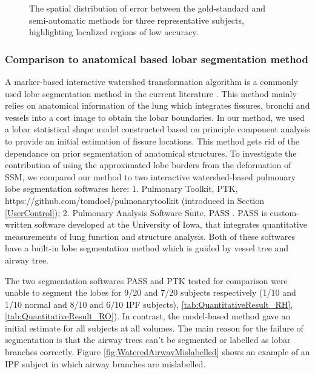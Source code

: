 {\begin{figure}[htbp]
\begin{subfigure}{.38 \linewidth}
  \caption{}
  \label{fig:QuanlititativeResult-c} 
\end{subfigure}
\caption{The spatial distribution of error between the gold-standard and semi-automatic methods for three representative subjects, highlighting localized regions of low accuracy.}
\label{fig:QuanlititativeResult}
\end{figure}

\subsubsection{Comparison to anatomical based lobar segmentation method}
A marker-based interactive watershed transformation algorithm is a commonly used lobe segmentation method in the current literature \citep{ukil2009anatomy,pu2009pulmonary,lassen2011interactive,lassen2013automatic}. This method mainly relies on anatomical information of the lung which integrates fissures, bronchi and vessels into a cost image to obtain the lobar boundaries. In our method, we used a lobar statistical shape model constructed based on principle component analysis to provide an initial estimation of fissure locations. This method gets rid of the dependance on prior segmentation of anatomical structures. To investigate the contribution of using the approximated lobe borders from the deformation of SSM, we compared our method to two interactive watershed-based pulmonary lobe segmentation softwares here: 1. Pulmonary Toolkit, PTK, https://github.com/tomdoel/pulmonarytoolkit (introduced in Section \ref{UserControl}); 2. Pulmonary Analysis Software Suite, PASS \citep{guo2008pulmonary}. PASS is custom-written software developed at the University of Iowa, that integrates quantitative measurements of lung function and structure analysis. Both of these softwares have a built-in lobe segmentation method which is guided by vessel tree and airway tree.

The two segmentation softwares PASS and PTK tested for comparison were unable to segment the lobes for 9/20 and 7/20 subjects respectively (1/10 and 1/10 normal and 8/10 and 6/10 IPF subjects), \ref{tab:QuantitativeResult_RH}, \ref{tab:QuantitativeResult_RO}). In contrast, the model-based method gave an initial estimate for all subjects at all volumes. The main reason for the failure of segmentation is that the airway trees can't be segmented or labelled as lobar branches correctly. Figure \ref{fig:WateredAirwayMislabelled} shows an example of an IPF subject in which airway branches are mislabelled. 
\newpage

}
